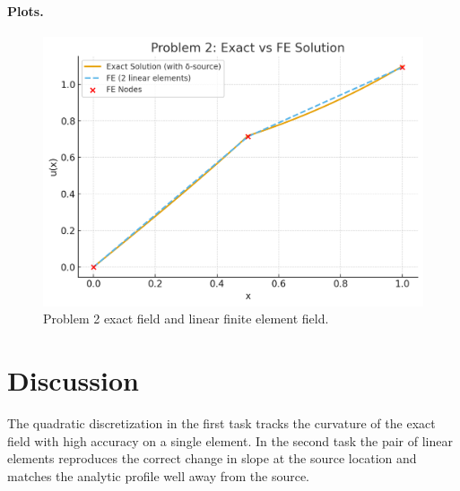 \documentclass[12pt,a4paper]{article}
\begin{document}
\paragraph{Plots.}
\begin{figure}[H]
  \centering
  \includegraphics[width=0.7\linewidth]{hw3_prob2.png}
  \caption{Problem 2 exact field and linear finite element field.}
\end{figure}

\section*{Discussion}
The quadratic discretization in the first task tracks the curvature of the exact field with high accuracy on a single element. In the second task the pair of linear elements reproduces the correct change in slope at the source location and matches the analytic profile well away from the source.
\end{document}

